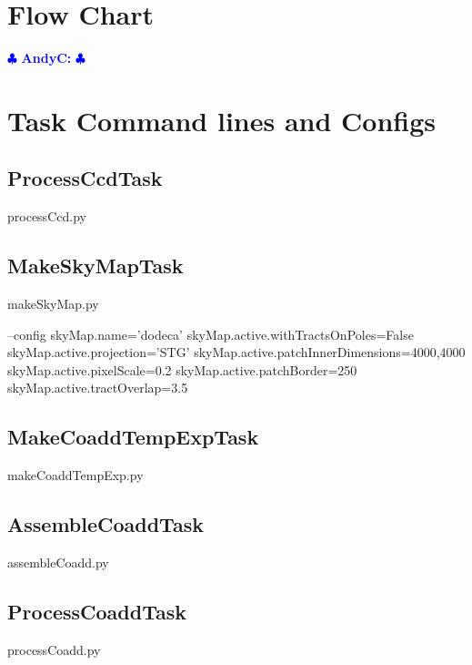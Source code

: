 \documentclass[12pt]{article}
\newcommand{\ajc} { \textcolor{blue} {
\ensuremath{\clubsuit} {\bf AndyC:}  
\ensuremath{\clubsuit} } }
\begin{document}

\clearpage 
\begin{appendices}

\section{Flow Chart} \ajc

\section{Task Command lines and Configs}

\subsection{ProcessCcdTask}
\begin{python}
processCcd.py
\end{python}


\subsection{MakeSkyMapTask}
\begin{python}
makeSkyMap.py

--config
skyMap.name='dodeca'
skyMap.active.withTractsOnPoles=False
skyMap.active.projection='STG'
skyMap.active.patchInnerDimensions=4000,4000
skyMap.active.pixelScale=0.2
skyMap.active.patchBorder=250
skyMap.active.tractOverlap=3.5
\end{python}

\subsection{MakeCoaddTempExpTask} 
\begin{python}
makeCoaddTempExp.py
\end{python}

\subsection{AssembleCoaddTask} 
\begin{python}
assembleCoadd.py
\end{python}

\subsection{ProcessCoaddTask} 
\begin{python}
processCoadd.py
\end{python}


\end{appendices}
\end{document}
